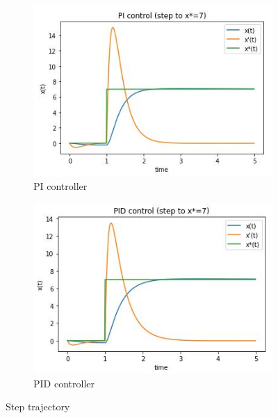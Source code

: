 \documentclass[12pt,letterpaper]{article}
\begin{document}
    \begin{figure}[htb]
        \begin{subfigure}{.5\textwidth}
            \centering
            \includegraphics[width=1\linewidth]{images/output/36_0_10-S7.jpg}
            \caption{PI controller}
        \end{subfigure}
        \begin{subfigure}{.5\textwidth}
          \centering
          \includegraphics[width=1\linewidth]{images/output/36_2_9-S7.jpg}
          \caption{PID controller}
        \end{subfigure}
    \caption{Step trajectory}
    \label{fig:PI_PID_step}
    \end{figure}
    
\end{document}
